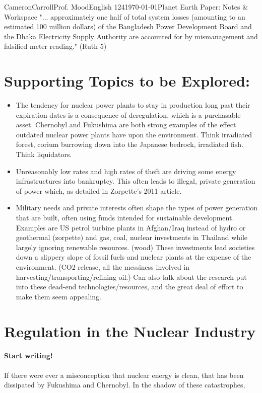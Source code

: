 \documentclass[12pt,letterpaper]{article}
\begin{document}
\begin{mla}{Cameron}{Carroll}{Prof. Mood}{English 124}{\today}{Planet Earth Paper: Notes \& Workspace}
"... approximately one half of total system losses (amounting to an estimated 100 million dollars) of the Bangladesh Power Development Board and the Dhaka Electricity Supply Authority are accounted for by mismanagement and falsified meter reading." (Ruth 5)

\section*{Supporting Topics to be Explored:}
\begin{itemize}
\item The tendency for nuclear power plants to stay in production long past their expiration dates is a consequence of deregulation, which is a purchasable asset. Chernobyl and Fukushima are both strong examples of the effect outdated nuclear power plants have upon the environment. Think irradiated forest, corium burrowing down into the Japanese bedrock, irradiated fish. Think liquidators.
\item Unreasonably low rates and high rates of theft are driving some energy infrastructures into bankruptcy. This often leads to illegal, private generation of power which, as detailed in Zorpette's 2011 article.
\item Military needs and private interests often shape the types of power generation that are built, often using funds intended for sustainable development. Examples are US petrol turbine plants in Afghan/Iraq instead of hydro or geothermal (zorpette) and  gas, coal, nuclear investments in Thailand while largely ignoring renewable resources. (wood) These investments lead societies down a slippery slope of fossil fuels and nuclear plants at the expense of the environment. (CO2 release, all the messiness involved in harvesting/transporting/refining oil.) Can also talk about the research put into these dead-end technologies/resources, and the great deal of effort to make them seem appealing.
\end{itemize}

\section{Regulation in the Nuclear Industry}
\paragraph{Start writing!}
If there were ever a misconception that nuclear energy is clean, that has been dissipated by Fukushima and Chernobyl. In the shadow of these catastrophes, 



\end{mla}
\end{document}
